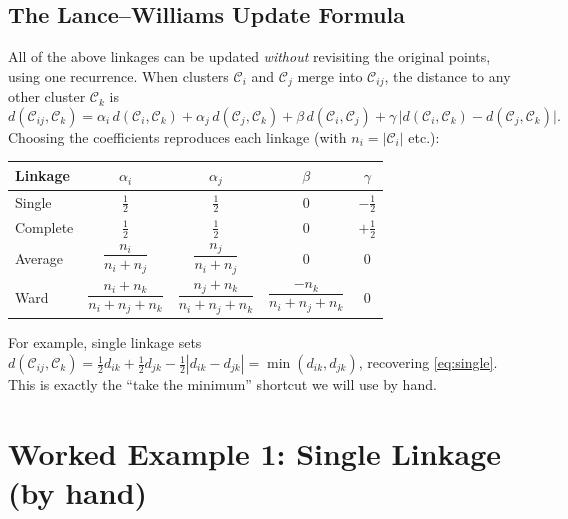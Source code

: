 \documentclass[11pt,a4paper]{report}
\theoremstyle{definition}
\theoremstyle{plain}
\theoremstyle{remark}
\newcommand{\C}{\mathcal{C}}
\begin{document}
\section{The Lance--Williams Update Formula}
All of the above linkages can be updated \emph{without} revisiting the original
points, using one recurrence. When clusters $\C_i$ and $\C_j$ merge into
$\C_{ij}$, the distance to any other cluster $\C_k$ is
\begin{equation}
d(\C_{ij},\C_k)=\alpha_i\,d(\C_i,\C_k)+\alpha_j\,d(\C_j,\C_k)
              +\beta\,d(\C_i,\C_j)+\gamma\,\lvert d(\C_i,\C_k)-d(\C_j,\C_k)\rvert .
\label{eq:lw}
\end{equation}
Choosing the coefficients reproduces each linkage (with
$n_i=|\C_i|$ etc.):
\begin{center}
\begin{tabular}{@{}lcccc@{}}
\toprule
Linkage & $\alpha_i$ & $\alpha_j$ & $\beta$ & $\gamma$\\
\midrule
Single   & $\tfrac12$ & $\tfrac12$ & $0$ & $-\tfrac12$\\[2pt]
Complete & $\tfrac12$ & $\tfrac12$ & $0$ & $+\tfrac12$\\[2pt]
Average  & $\dfrac{n_i}{n_i+n_j}$ & $\dfrac{n_j}{n_i+n_j}$ & $0$ & $0$\\[6pt]
Ward     & $\dfrac{n_i+n_k}{n_i+n_j+n_k}$ & $\dfrac{n_j+n_k}{n_i+n_j+n_k}$
         & $\dfrac{-n_k}{n_i+n_j+n_k}$ & $0$\\
\bottomrule
\end{tabular}
\end{center}
For example, single linkage sets
$d(\C_{ij},\C_k)=\tfrac12 d_{ik}+\tfrac12 d_{jk}-\tfrac12|d_{ik}-d_{jk}|
=\min(d_{ik},d_{jk})$, recovering \eqref{eq:single}. This is exactly the
``take the minimum'' shortcut we will use by hand.

\chapter{Worked Example 1: Single Linkage (by hand)}
\label{ch:single}
\end{document}
